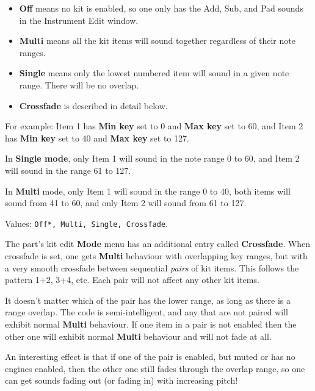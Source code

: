    \begin{itemize}
      \item \textbf{Off} means no kit is enabled, so one only has the Add,
         Sub, and Pad sounds in the Instrument Edit window.
      \item \textbf{Multi} means all the kit items will sound together
         regardless of their note ranges.
      \item \textbf{Single} means only the lowest numbered item will sound
         in a given note range. There will be no overlap.
      \item \textbf{Crossfade} is described in detail below.
   \end{itemize}

   For example:
   Item 1 has \textbf{Min key} set to 0 and \textbf{Max key} set to 60, and
   Item 2 has \textbf{Min key} set to 40 and \textbf{Max key} set to 127.

   In \textbf{Single mode}, only Item 1 will sound in the note range 0 to
   60, and Item 2 will sound in the range 61 to 127.

   In \textbf{Multi} mode, only Item 1 will sound in the range 0 to 40, both
   items will sound from 41 to 60, and only Item 2 will sound from 61 to
   127.

   Values: \texttt{Off*, Multi, Single, Crossfade}.

   The part's kit edit \textbf{Mode} menu has an additional entry
   called \textbf{Crossfade}.
   When crossfade is set, one gets \textbf{Multi} behaviour with overlapping key
   ranges, but with a very smooth crossfade between sequential \textsl{pairs}
   of kit items. This follows the pattern 1+2, 3+4, etc. Each pair will not
   affect any other kit items.

   It doesn't matter which of the pair has the lower range, as long as there is
   a range overlap. The code is semi-intelligent, and any that are not paired
   will exhibit normal \textbf{Multi} behaviour. If one item in a pair is not
   enabled then the other one will exhibit normal \textbf{Multi} behaviour and
   will not fade at all.

   An interesting effect is that if one of the pair is enabled, but muted or
   has no engines enabled, then the other one still fades through the overlap
   range, so one can get sounds fading out (or fading in) with increasing
   pitch!

